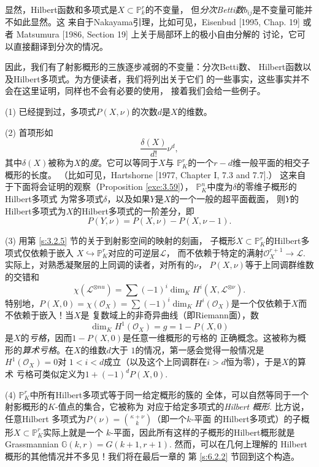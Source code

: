 显然，Hilbert函数和多项式是$X\subset \mathbb P_k^r$的不变量，
但\textit{分次Betti数}$b_{ij}$是不变量可能并不如此显然。这
来自于Nakayama引理，比如可见，Eisenbud [1995, Chap. 19] 或者
Matsumura [1986, Section 19] 上关于局部环上的极小自由分解的
讨论，它可以直接翻译到分次的情况。

因此，我们有了射影概形的三族逐步减弱的不变量：分次Betti数、
Hilbert函数以及Hilbert多项式。为方便读者，我们将列出关于它们
的一些事实，这些事实并不会在这里证明，同样也不会有必要的使用，
接着我们会给一些例子。

(1) 已经提到过，多项式$P(X,\nu)$的次数$d$是$X$的维数。

(2) 首项形如
\[
  \frac{\delta(X)}{d!}\nu^d,
\]
其中$\delta(X)$被称为$X$的\textit{度}。它可以等同于$X$与
$\mathbb P_K^r$的一个$r-d$维一般平面的相交子概形的长度。
（比如可见，Hartshorne [1977, Chapter I, 7.3 and 7.7].）
这来自于下面将会证明的观察（Proposition \ref{exe:3.59}），
$\mathbb P_K^n$中度为$\delta$的零维子概形的Hilbert多项式
为常多项式$\delta$，以及如果$Y$是$X$的一个一般的超平面截面，
则$Y$的Hilbert多项式为$X$的Hilbert多项式的一阶差分，即
\[
  P(Y,\nu)=P(X,\nu)-P(X,\nu-1).
\]

(3) 用第 \ref{s:3.2.5} 节的关于到射影空间的映射的刻画，
子概形$X\subset \mathbb P_K^r$的Hilbert多项式仅依赖于嵌入
$X\hookrightarrow \mathbb P_K^r$对应的可逆层$\mathscr L$，
而不依赖于特定的满射$\mathscr O_X^{r+1}\to \mathscr L$. 
实际上，对熟悉凝聚层的上同调的读者，对所有的$\nu$，
$P(X,\nu)$等于上同调群维数的交错和
\[
  \chi(\mathscr L^{\otimes nu})=\sum (-1)^i \dim_K H^i
  (X,\mathscr L^{\otimes \nu}).
\]
特别地，$P(X,0)=\chi(\mathscr O_X)=\sum (-1)^i \dim_K
H^i(\mathscr O_X)$是一个仅依赖于$X$而不依赖于嵌入！当$X$是
复数域上的非奇异曲线（即Riemann面），数
\[
  \dim_K H^1(\mathscr O_X)=g=1-P(X,0)
\]
是$X$的\textit{亏格}，因而$1-P(X,0)$是任意一维概形的亏格的
正确概念。这被称为概形的\textit{算术亏格}。在$X$的维数$d$大于
$1$的情况，第一感会觉得一般情况是$H^1(\mathscr O_X)=0$对
$1< i < d$成立（以及这个上同调群在$i>d$恒为零），于是$X$的算术
亏格可类似定义为$1+(-1)^d P(X,0)$.

(4) $\mathbb P_K^r$中所有Hilbert多项式等于同一给定概形的簇的
全体，可以自然等同于一个射影概形的$K$-值点的集合，它被称为
对应于给定多项式的\textit{Hilbert 概形}. 比方说，任意Hilbert
多项式为$P(\nu)=\binom{\kappa+\nu}{k}$（即一个$k$-平面
的Hilbert多项式）的子概形$X\subset \mathbb P_K^r$实际上就是一个
$k$-平面，因此所有这样的子概形的Hilbert概形就是Grassmannian%
$\mathbb G(k,r)=G(k+1,r+1)$. 然而，可以在几何上理解的
Hilbert概形的其他情况并不多见！我们将在最后一章的
第 \ref{s:6.2.2} \nottran 节回到这个构造。

